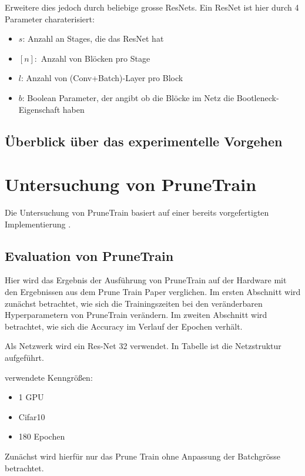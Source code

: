 Erweitere dies jedoch durch beliebige grosse ResNets. Ein ResNet ist hier durch 4 Parameter charaterisiert:

\begin{itemize}
 \item $s$: Anzahl an Stages, die das ResNet hat
 \item $[n]:$ Anzahl von Blöcken pro Stage 
 \item $l$: Anzahl von (Conv+Batch)-Layer pro Block
 \item $b$: Boolean Parameter, der angibt ob die Blöcke im Netz die Bootleneck-Eigenschaft haben
\end{itemize}
\subsection{Überblick über das experimentelle Vorgehen}


\section{Untersuchung von PruneTrain}

Die Untersuchung von PruneTrain basiert auf einer bereits vorgefertigten Implementierung \cite{ptImpl}. 

\subsection{Evaluation von PruneTrain}

Hier wird das Ergebnis der Ausführung von PruneTrain auf der Hardware mit den Ergebnissen aus dem Prune Train Paper verglichen. Im ersten Abschnitt wird zunächst betrachtet, wie sich die Trainingszeiten bei den veränderbaren Hyperparametern von PruneTrain verändern. Im zweiten Abschnitt wird betrachtet, wie sich die Accuracy im Verlauf der Epochen verhält.

Als Netzwerk wird ein Res-Net 32 verwendet. In Tabelle  ist die Netzstruktur aufgeführt.



verwendete Kenngrößen:

\begin{itemize}
 \item 1 GPU
 \item Cifar10
 \item 180 Epochen
\end{itemize}

Zunächst wird hierfür nur das Prune Train ohne Anpassung der Batchgrösse betrachtet. 

